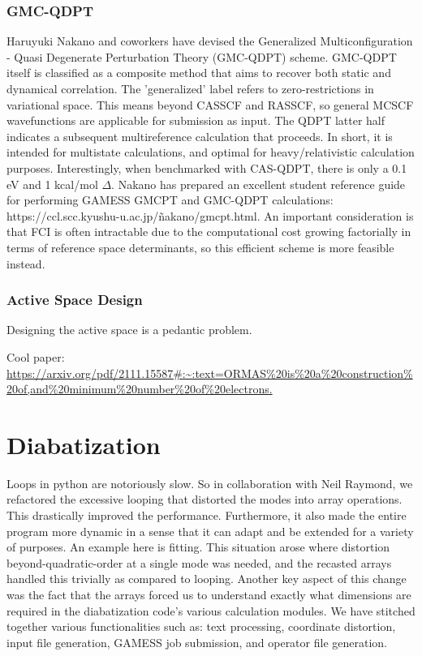 \documentclass[letterpaper, 12pt, oneside]{report}
\begin{document}
        \subsubsection{GMC-QDPT}
        Haruyuki Nakano and coworkers have devised the Generalized Multiconfiguration - Quasi Degenerate Perturbation Theory (GMC-QDPT) scheme. GMC-QDPT itself is classified as a composite method that aims to recover both static and dynamical correlation. The 'generalized' label refers to zero-restrictions in variational space. This means beyond CASSCF and RASSCF, so general MCSCF wavefunctions are applicable for submission as input. The QDPT latter half indicates a subsequent multireference calculation that proceeds. In short, it is intended for multistate calculations, and optimal for heavy/relativistic calculation purposes. Interestingly, when benchmarked with CAS-QDPT, there is only a 0.1 eV and 1 kcal/mol $\Delta$. Nakano has prepared an excellent student reference guide for performing GAMESS GMCPT and GMC-QDPT calculations: {https://ccl.scc.kyushu-u.ac.jp/\~nakano/gmcpt.html}. An important consideration is that FCI is often intractable due to the computational cost growing factorially in terms of reference space determinants, so this efficient scheme is more feasible instead.

        \subsubsection{Active Space Design}
        Designing the active space is a pedantic problem.
        
        Cool paper: \url{https://arxiv.org/pdf/2111.15587#:~:text=ORMAS%20is%20a%20construction%20of,and%20minimum%20number%20of%20electrons.}


\section{Diabatization\label{sec:s1}}

    Loops in python are notoriously slow. So in collaboration with Neil Raymond, we refactored the excessive looping that distorted the modes into array operations. This drastically improved the performance. Furthermore, it also made the entire program more dynamic in a sense that it can adapt and be extended for a variety of purposes. An example here is fitting. This situation arose where distortion beyond-quadratic-order at a single mode was needed, and the recasted arrays handled this trivially as compared to looping. Another key aspect of this change was the fact that the arrays forced us to understand exactly what dimensions are required in the diabatization code's various calculation modules. We have stitched together various functionalities such as: text processing, coordinate distortion, input file generation, GAMESS job submission, and operator file generation. 
\end{document}
